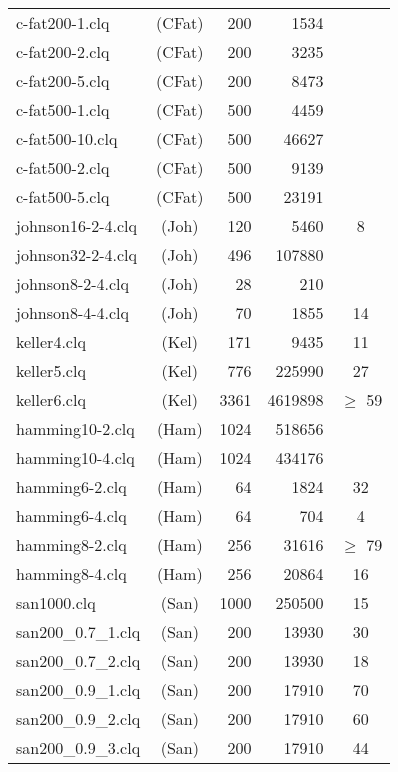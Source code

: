 
\tablelasttail{\hline}
\begin{supertabular}{|lc|rr|c|}
c-fat200-1.clq&(CFat)&200&1534&\\
c-fat200-2.clq&(CFat)&200&3235&\\
c-fat200-5.clq&(CFat)&200&8473&\\
c-fat500-1.clq&(CFat)&500&4459&\\
c-fat500-10.clq&(CFat)&500&46627&\\
c-fat500-2.clq&(CFat)&500&9139&\\
c-fat500-5.clq&(CFat)&500&23191&\\
johnson16-2-4.clq&(Joh)&120&5460&8\\
johnson32-2-4.clq&(Joh)&496&107880&\\
johnson8-2-4.clq&(Joh)&28&210&\\
johnson8-4-4.clq&(Joh)&70&1855&14\\
keller4.clq&(Kel)&171&9435&11\\
keller5.clq&(Kel)&776&225990&27\\
keller6.clq&(Kel)&3361&4619898&$\ge$ 59\\
hamming10-2.clq&(Ham)&1024&518656&\\
hamming10-4.clq&(Ham)&1024&434176&\\
hamming6-2.clq&(Ham)&64&1824&32\\
hamming6-4.clq&(Ham)&64&704&4\\
hamming8-2.clq&(Ham)&256&31616&$\ge$ 79\\
hamming8-4.clq&(Ham)&256&20864&16\\
san1000.clq&(San)&1000&250500&15\\
san200\_0.7\_1.clq&(San)&200&13930&30\\
san200\_0.7\_2.clq&(San)&200&13930&18\\
san200\_0.9\_1.clq&(San)&200&17910&70\\
san200\_0.9\_2.clq&(San)&200&17910&60\\
san200\_0.9\_3.clq&(San)&200&17910&44\\

\end{supertabular}
